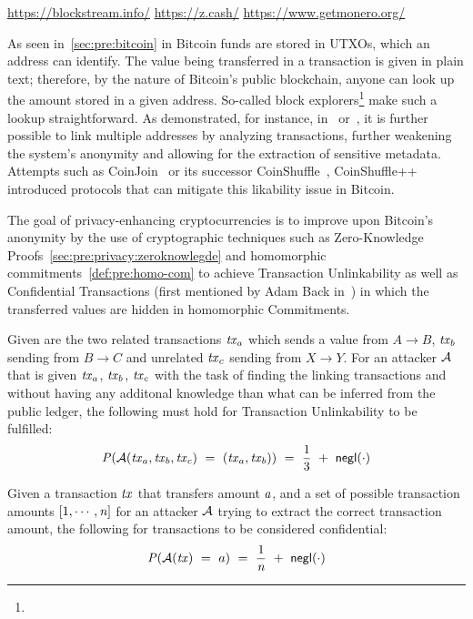\urldef\urlblockexp\url{https://blockstream.info/}
\urldef\urlzcash\url{https://z.cash/}
\urldef\urlmonero\url{https://www.getmonero.org/}

As seen in~\cref{sec:pre:bitcoin} in Bitcoin funds are stored in UTXOs, which an address can identify.
The value being transferred in a transaction is given in plain text; therefore, by the nature of Bitcoin’s public blockchain, anyone can look up the amount stored in a given address.
So-called block explorers\footnote{\urlblockexp} make such a lookup straightforward.
As demonstrated, for instance, in~\cite{barber2012bitter} or~\cite{reid2013analysis}, it is further possible to link multiple addresses by analyzing transactions, further weakening the system's anonymity and allowing for the extraction of sensitive metadata.
Attempts such as CoinJoin~\cite{maxwell2013coinjoin} or its successor CoinShuffle~\cite{ruffing2014coinshuffle}, CoinShuffle++~\cite{ruffing2017p2p} introduced protocols that can mitigate this likability issue in Bitcoin.

The goal of privacy-enhancing cryptocurrencies is to improve upon Bitcoin's anonymity by the use of cryptographic techniques such as Zero-Knowledge Proofs~\cref{sec:pre:privacy:zeroknowlegde} and homomorphic commitments~\cref{def:pre:homo-com} to achieve Transaction Unlinkability as well as Confidential Transactions (first mentioned by Adam Back in~\cite{back2013confidentialtx}) in which the transferred values are hidden in homomorphic Commitments.

\begin{definition} \label{def:pre:privacy:tx-unlink}
    Given are the two related transactions $\mathit{tx}_a$ which sends a value from $A \rightarrow B$, $\mathit{tx}_b$ sending from $B \rightarrow C$ and unrelated $\mathit{tx}_c$ sending from $X \rightarrow Y$.
For an attacker $\mathcal{A}$ that is given $\mathit{tx}_a$, $\mathit{tx}_b$, $\mathit{tx}_c$ with the task of finding the linking transactions and without having any additonal knowledge than what can be inferred from the public ledger, the following must hold for Transaction Unlinkability to be fulfilled:
    \[ \mathit{P}(\mathcal{A}(\mathit{tx}_a, \mathit{tx}_b, \mathit{tx}_c) ~=~ (\mathit{tx}_a, \mathit{tx}_b)) ~=~ \frac{1}{3} ~+~ \mathsf{negl}(\cdot)\]
\end{definition}

\begin{definition} \label{def:pre:privacy:conf-tx}
    Given a transaction $\mathit{tx}$ that transfers amount $a$, and a set of possible transaction amounts $[1,\cdots,\mathit{n}]$ for an attacker $\mathcal{A}$ trying to extract the correct transaction amount, the following for transactions to be considered confidential: 
    \[ \mathit{P}(\mathcal{A}(\mathit{tx}) ~=~ a) ~=~ \frac{1}{\mathit{n}} ~+~ \mathsf{negl}(\cdot) \]
\end{definition}

